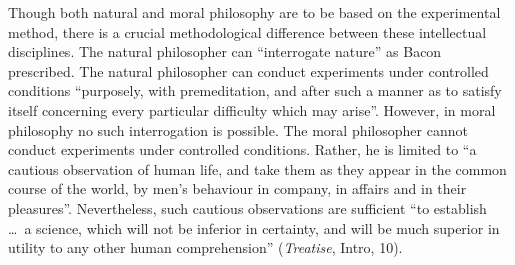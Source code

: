 Though both natural and moral philosophy are to be based on the experimental method, there is a crucial methodological difference between these intellectual disciplines. The natural philosopher can ``interrogate nature'' as Bacon prescribed. The natural philosopher can conduct experiments under controlled conditions ``purposely, with premeditation, and after such a manner as to satisfy itself concerning every particular difficulty which may arise''. However, in moral philosophy no such interrogation is possible. The moral philosopher cannot conduct experiments under controlled conditions. Rather, he is limited to ``a cautious observation of human life, and take them as they appear in the common course of the world, by men’s behaviour in company, in affairs and in their pleasures''. Nevertheless, such cautious observations are sufficient ``to establish \ldots\ a science, which will not be inferior in certainty, and will be much superior in utility to any other human comprehension'' (\emph{Treatise}, Intro, 10). \change

% 


